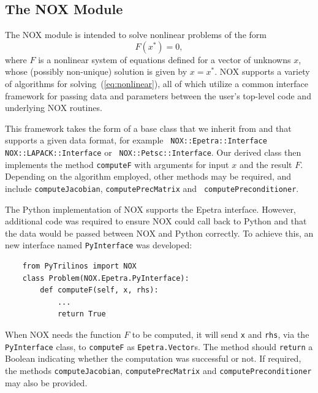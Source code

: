 \documentclass[acmtocl]{acmtrans2m}
\begin{document}
\subsection{The NOX Module}
\label{subsec:nox}

The NOX module is intended to solve nonlinear problems of the form
\begin{equation}
  \label{eq:nonlinear}
  F(x^*) = 0,
\end{equation}
where $F$ is a nonlinear system of equations defined for a vector of
unknowns $x$, whose (possibly non-unique) solution is given by
$x=x^*$.  NOX supports a variety of algorithms for
solving~(\ref{eq:nonlinear}), all of which utilize a common interface
framework for passing data and parameters between the user's top-level
code and underlying NOX routines.

This framework takes the form of a base class that we inherit from and
that supports a given data format, for example {\tt
  NOX::Epetra::Interface} {\tt NOX::LAPACK::Interface} or {\tt
  NOX::Petsc::Interface}.  Our derived class then implements the
method {\tt computeF} with arguments for input $x$ and the result $F$.
Depending on the algorithm employed, other methods may be required,
and include {\tt computeJacobian}, {\tt computePrecMatrix} and {\tt
  computePreconditioner}.

The Python implementation of NOX supports the Epetra interface.
However, additional code was required to ensure NOX could call back to
Python and that the data would be passed between NOX and Python
correctly.  To achieve this, an new interface named {\tt PyInterface}
was developed:
\begin{verbatim}
    from PyTrilinos import NOX
    class Problem(NOX.Epetra.PyInterface):
        def computeF(self, x, rhs):
            ...
            return True
\end{verbatim}
When NOX needs the function $F$ to be computed, it will send {\tt x}
and {\tt rhs}, via the {\tt PyInterface} class, to {\tt computeF} as
{\tt Epetra.Vector}s.  The method should {\tt return} a Boolean
indicating whether the computation was successful or not.  If
required, the methods {\tt computeJacobian}, {\tt computePrecMatrix}
and {\tt computePreconditioner} may also be provided.
\end{document}
